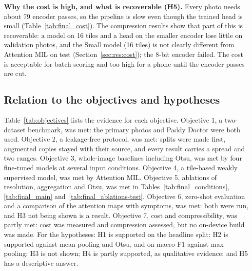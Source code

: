 \textbf{Why the cost is high, and what is recoverable (H5).} Every photo needs about 79 encoder passes, so the pipeline is
slow even though the trained head is small (Table~\ref{tab:final_cost}). The compression results show that part of this is
recoverable: a model on 16 tiles and a head on the smaller encoder lose little on validation photos, and the Small model
(16 tiles) is not clearly different from Attention MIL on test (Section~\ref{sec:res:cost}); the 8-bit encoder failed. The
cost is acceptable for batch scoring and too high for a phone until the encoder passes are cut.

\subsection{Relation to the objectives and hypotheses}
Table~\ref{tab:objectives} lists the evidence for each objective.
Objective 1, a two-dataset benchmark, was met: the primary photos and Paddy Doctor were both used.
Objective 2, a leakage-free protocol, was met: splits were made first, augmented copies stayed with their source, and every
result carries a spread and two ranges.
Objective 3, whole-image baselines including Otsu, was met by four fine-tuned models at several input conditions.
Objective 4, a tile-based weakly supervised model, was met by Attention MIL.
Objective 5, ablations of resolution, aggregation and Otsu, was met in Tables~\ref{tab:final_conditions},
\ref{tab:final_main} and~\ref{tab:final_ablations-test}.
Objective 6, zero-shot evaluation and a comparison of the attention maps with symptoms, was met: both were run, and H3 not
being shown is a result.
Objective 7, cost and compressibility, was partly met: cost was measured and compression assessed, but no on-device build
was made.
For the hypotheses: H1 is supported on the headline split; H2 is supported against mean pooling and Otsu, and on macro-F1
against max pooling; H3 is not shown; H4 is partly supported, as qualitative evidence; and H5 has a descriptive answer.

